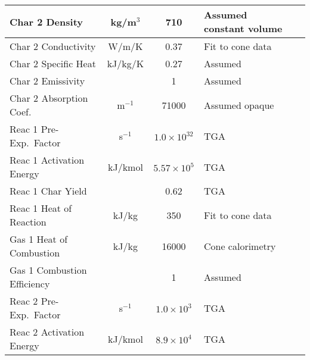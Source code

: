 \begin{table}[p]
\begin{center}
\begin{tabular}{|l|c|c|l|l|}
Char 2 Density              & kg/m$^3$      & 710                               & Assumed constant volume   &  \cite{Oztekin:CF2012}                  \\ \hline
Char 2 Conductivity         & W/m/K         & 0.37                              & Fit to cone data          &  \cite{Oztekin:CF2012}                  \\ \hline
Char 2 Specific Heat        & kJ/kg/K       & 0.27                              & Assumed                   &  \cite{Oztekin:CF2012}                  \\ \hline
Char 2 Emissivity           &               & 1                                 & Assumed                   &  \cite{Oztekin:CF2012}                  \\ \hline
Char 2 Absorption Coef.     & m$^{-1}$      & 71000                             & Assumed opaque            &  \cite{Oztekin:CF2012}                  \\ \hline
Reac 1 Pre-Exp.~Factor      & s$^{-1}$      & $1.0 \times 10^{32}$              & TGA                       &  \cite{Oztekin:CF2012}                  \\ \hline
Reac 1 Activation Energy    & kJ/kmol       & $5.57 \times 10^5$                & TGA                       &  \cite{Oztekin:CF2012}                  \\ \hline
Reac 1 Char Yield           &               & 0.62                              & TGA                       &  \cite{Oztekin:CF2012}                  \\ \hline
Reac 1 Heat of Reaction     & kJ/kg         & 350                               & Fit to cone data          &  \cite{Oztekin:CF2012}                  \\ \hline
Gas 1 Heat of Combustion    & kJ/kg         & 16000                             & Cone calorimetry          &  \cite{Oztekin:CF2012}                  \\ \hline
Gas 1 Combustion Efficiency &               & 1                                 & Assumed                   &  \cite{Oztekin:CF2012}                  \\ \hline
Reac 2 Pre-Exp.~Factor      & s$^{-1}$      & $1.0 \times 10^3$                 & TGA                       &  \cite{Oztekin:CF2012}                  \\ \hline
Reac 2 Activation Energy    & kJ/kmol       & $8.9 \times 10^4$                 & TGA                       &  \cite{Oztekin:CF2012}                  \\ \hline

\end{tabular}
\end{center}
\end{table}
